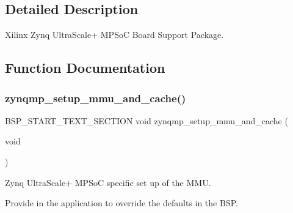 \subsection{Detailed Description}
Xilinx Zynq Ultra\+Scale+ M\+P\+SoC Board Support Package. 



\subsection{Function Documentation}
\mbox{\label{group__RTEMSBSPsARMZynqMP_gab627dbb0ad83044bd6441e834db2350c}} 
\subsubsection{\texorpdfstring{zynqmp\_setup\_mmu\_and\_cache()}{zynqmp\_setup\_mmu\_and\_cache()}}
{\footnotesize\ttfamily B\+S\+P\+\_\+\+S\+T\+A\+R\+T\+\_\+\+T\+E\+X\+T\+\_\+\+S\+E\+C\+T\+I\+ON void zynqmp\+\_\+setup\+\_\+mmu\+\_\+and\+\_\+cache (\begin{DoxyParamCaption}\item[{void}]{ }\end{DoxyParamCaption})}



Zynq Ultra\+Scale+ M\+P\+SoC specific set up of the M\+MU. 

Provide in the application to override the defaults in the B\+SP. 